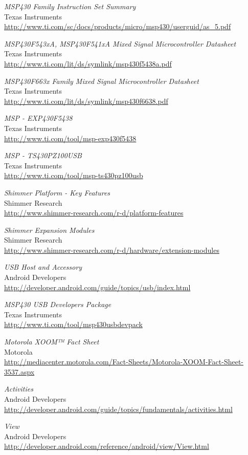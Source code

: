 \begin{thebibliography}{widest-label}
	\emph{MSP430 Family Instruction Set Summary}\\
	Texas Instruments\\
	\url{http://www.ti.com/sc/docs/products/micro/msp430/userguid/as_5.pdf}
	
	\emph{MSP430F543xA, MSP430F541xA Mixed Signal Microcontroller Datasheet}\\
	Texas Instruments\\
	\url{http://www.ti.com/lit/ds/symlink/msp430f5438a.pdf}
	
	\emph{MSP430F663x Family Mixed Signal Microcontroller Datasheet}\\
	Texas Instruments\\
	\url{http://www.ti.com/lit/ds/symlink/msp430f6638.pdf}

	\emph{MSP - EXP430F5438}\\
	Texas Instruments\\
	\url{http://www.ti.com/tool/msp-exp430f5438}

	\emph{MSP - TS430PZ100USB}\\
	Texas Instruments\\
	\url{http://www.ti.com/tool/msp-ts430pz100usb}

	\emph{Shimmer Platform - Key Features}\\
	Shimmer Research\\
	\url{http://www.shimmer-research.com/r-d/platform-features}

	\emph{Shimmer Expansion Modules}\\
	Shimmer Research\\
	\url{http://www.shimmer-research.com/r-d/hardware/extension-modules}

	\emph{USB Host and Accessory}\\
	Android Developers\\
	\url{http://developer.android.com/guide/topics/usb/index.html}
	
	\emph{MSP430 USB Developers Package}\\
	Texas Instruments\\
	\url{http://www.ti.com/tool/msp430usbdevpack}
	
	\emph{Motorola XOOM™ Fact Sheet}\\
	Motorola\\
	\url{http://mediacenter.motorola.com/Fact-Sheets/Motorola-XOOM-Fact-Sheet-3537.aspx}

	\emph{Activities}\\
	Android Developers\\
	\url{http://developer.android.com/guide/topics/fundamentals/activities.html}
	
	\emph{View}\\
	Android Developers\\
	\url{http://developer.android.com/reference/android/view/View.html}

\end{thebibliography}
